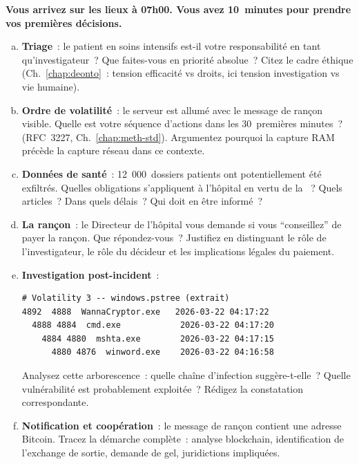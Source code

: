 \begin{boxexo}[title={\ding{45}\quad SANAGA --- Décisions immédiate et médiate}]
\textbf{Vous arrivez sur les lieux à 07h00. Vous avez 10~minutes
pour prendre vos premières décisions.}

\begin{enumerate}[(a)]
    \item \textbf{Triage}~: le patient en soins intensifs est-il
          votre responsabilité en tant qu'investigateur~?
          Que faites-vous en priorité absolue~? Citez le cadre
          éthique (Ch.~\ref{chap:deonto}~: tension efficacité
          vs droits, ici tension investigation vs vie humaine).
    \item \textbf{Ordre de volatilité}~: le serveur est allumé
          avec le message de rançon visible. Quelle est votre
          séquence d'actions dans les 30~premières minutes~?
          (RFC~3227, Ch.~\ref{chap:meth-std}). Argumentez pourquoi
          la capture RAM précède la capture réseau dans ce contexte.
    \item \textbf{Données de santé}~: 12~000~dossiers patients
          ont potentiellement été exfiltrés. Quelles obligations
          s'appliquent à l'hôpital en vertu de la
          ~? Quels articles~? Dans quels délais~?
          Qui doit en être informé~?
    \item \textbf{La rançon}~: le Directeur de l'hôpital vous
          demande si vous ``conseillez'' de payer la rançon.
          Que répondez-vous~? Justifiez en distinguant le rôle
          de l'investigateur, le rôle du décideur et les
          implications légales du paiement.
    \item \textbf{Investigation post-incident}~:
\begin{lstlisting}[language=bash_forensique]
# Volatility 3 -- windows.pstree (extrait)
4892  4888  WannaCryptor.exe   2026-03-22 04:17:22
  4888 4884  cmd.exe            2026-03-22 04:17:20
    4884 4880  mshta.exe        2026-03-22 04:17:15
      4880 4876  winword.exe    2026-03-22 04:16:58
\end{lstlisting}
          Analysez cette arborescence~: quelle chaîne d'infection
          suggère-t-elle~? Quelle vulnérabilité est probablement
          exploitée~? Rédigez la constatation correspondante.
    \item \textbf{Notification et coopération}~: le message de
          rançon contient une adresse Bitcoin. Tracez la démarche
          complète~: analyse blockchain, identification de l'exchange
          de sortie, demande de gel, juridictions impliquées.
\end{enumerate}
\end{boxexo}

